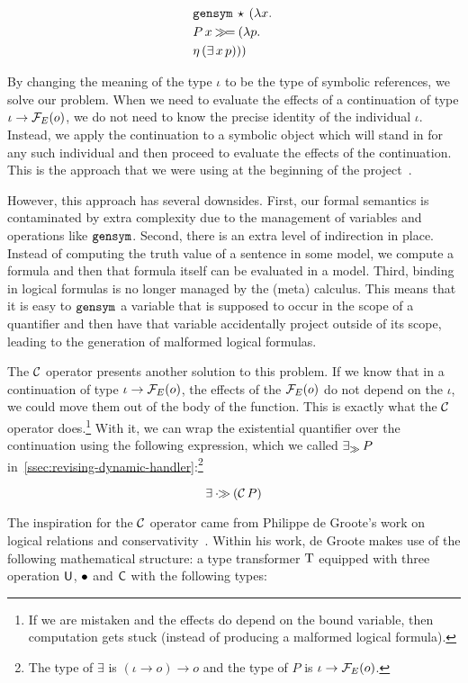 \begin{align*}
  &\mathtt{gensym}\,\star\,(\lambda x.\,  \\
  &P\,x \mathbin{\gg\!=} (\lambda p.\,  \\
  &\eta\,(\exists\,x\,p)))
\end{align*}

By changing the meaning of the type $\iota$ to be the type of symbolic
references, we solve our problem. When we need to evaluate the effects of a
continuation of type $\iota \to \mathcal{F}_E(o)$, we do not need to know the
precise identity of the individual $\iota$. Instead, we apply the
continuation to a symbolic object which will stand in for any such
individual and then proceed to evaluate the effects of the
continuation. This is the approach that we were using at the beginning of
the project~\cite{marsik2014algebraic}.

However, this approach has several downsides. First, our formal semantics
is contaminated by extra complexity due to the management of variables and
operations like $\mathtt{gensym}$. Second, there is an extra level of
indirection in place. Instead of computing the truth value of a sentence in
some model, we compute a formula and then that formula itself can be
evaluated in a model. Third, binding in logical formulas is no longer
managed by the (meta) calculus. This means that it is easy to $\mathtt{gensym}$
a variable that is supposed to occur in the scope of a quantifier and then
have that variable accidentally project outside of its scope, leading to
the generation of malformed logical formulas.

The $\mathcal{C}$ operator presents another solution to this problem. If we know
that in a continuation of type $\iota \to \mathcal{F}_E(o)$, the effects of the
$\mathcal{F}_E(o)$ do not depend on the $\iota$, we could move them out of the body
of the function. This is exactly what the $\mathcal{C}$ operator does.\footnote{If
  we are mistaken and the effects do depend on the bound variable, then
  computation gets stuck (instead of producing a malformed logical
  formula).} With it, we can wrap the existential quantifier over the
continuation using the following expression, which we called $\mathop{\exists_\gg} P$
in~\ref{ssec:revising-dynamic-handler}:\footnote{The type of $\exists$ is
  $(\iota \to o) \to o$ and the type of $P$ is $\iota \to \mathcal{F}_E(o)$.}

$$
  \exists \mathbin{\cdot\!\!\gg} (\mathcal{C}\,P)
$$

The inspiration for the $\mathcal{C}$ operator came from Philippe de Groote's work
on logical relations and
conservativity~\cite{degroote2015conservativity}. Within his work, de
Groote makes use of the following mathematical structure: a type
transformer $\text{T}$ equipped with three operation $\textsf{U}$, $\mathbin{\bullet}$ and $\textsf{C}$
with the following types:

